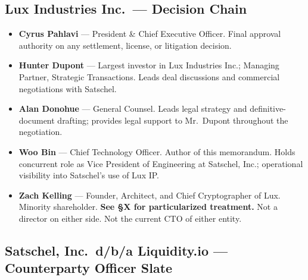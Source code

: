 \documentclass[11pt,letterpaper]{article}
\begin{document}
\subsection*{Lux Industries Inc.\ --- Decision Chain}

\begin{itemize}[leftmargin=1.5em,itemsep=0.2em]
\item \textbf{Cyrus Pahlavi} --- President \& Chief Executive Officer.
Final approval authority on any settlement, license, or litigation
decision.
\item \textbf{Hunter Dupont} --- Largest investor in Lux Industries
Inc.; Managing Partner, Strategic Transactions. Leads deal discussions
and commercial negotiations with Satschel.
\item \textbf{Alan Donohue} --- General Counsel. Leads legal strategy
and definitive-document drafting; provides legal support to Mr.\
Dupont throughout the negotiation.
\item \textbf{Woo Bin} --- Chief Technology Officer. Author of this
memorandum. Holds concurrent role as Vice President of Engineering at
Satschel, Inc.; operational visibility into Satschel's use of Lux IP.
\item \textbf{Zach Kelling} --- Founder, Architect, and Chief
Cryptographer of Lux. Minority shareholder. \textbf{See \S X for
particularized treatment.} Not a director on either side. Not the
current CTO of either entity.
\end{itemize}

\subsection*{Satschel, Inc.\ d/b/a Liquidity.io --- Counterparty Officer Slate}
\end{document}

